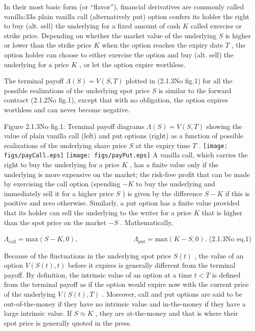 \documentclass{beamer}
\begin{document}
	\begin{frame}
		In their most basic form (or ``flavor''), financial derivatives are commonly called vanilla:33a plain vanilla call (alternatively put) option confers its holder the right to buy (alt. sell) the underlying for a fixed amount of cash $ K$ called exercise or strike price. Depending on whether the market value of the underlying $ S$ is higher or lower than the strike price $ K$ when the option reaches the expiry date $ T$ , the option holder can choose to either exercise the option and buy (alt. sell) the underlying for a price $ K$ , or let the option expire worthless.
	\end{frame}
	\begin{frame}
		The terminal payoff  $ \Lambda (S)=V(S,T)$ plotted in (2.1.3No fig.1) for all the possible realizations of the underlying spot price $ S$ is similar to the forward contract (2.1.2No fig.1), except that with no obligation, the option expires worthless and can never become negative.
		
		Figure 2.1.3No fig.1: Terminal payoff diagrams  $ \Lambda (S)=V(S,T)$ showing the value of plain vanilla call (left) and put options (right) as a function of possible realizations of the underlying share price $ S$ at the expiry time $ T$ .
		\texttt{[image: figs/payCall.eps]}        \texttt{[image: figs/payPut.eps]}
		A vanilla call, which carries the right to buy the underlying for a price $ K$ , has a finite value only if the underlying is more expensive on the market; the risk-free profit that can be made by exercising the call option (spending  $ -K$ to buy the underlying and immediately sell it for a higher price $ S$ ) is given by the difference $ S-K$ if this is positive and zero otherwise. Similarly, a put option has a finite value provided that its holder can sell the underlying to the writer for a price $ K$ that is higher than the spot price on the market $ -S$ . Mathematically,
		
		$\displaystyle \Lambda_\mathrm{call}=\mathrm{max}(S-K,0), \qquad\qquad\qquad\qquad \Lambda_\mathrm{put}=\mathrm{max}(K-S,0).$	 (2.1.3No eq.1)
		
		Because of the fluctuations in the underlying spot price $ S(t)$ , the value of an option $ V(S(t),t)$ before it expires is generally different from the terminal payoff. By definition, the intrinsic value of an option at a time $ t<T$ is defined from the terminal payoff as if the option would expire now with the current price of the underlying $ V(S(t),T)$ . Moreover, call and put options are said to be out-of-the-money if they have no intrinsic value and in-the-money if they have a large intrinsic value. If  $ S\approx K$ , they are at-the-money and that is where their spot price is generally quoted in the press. 
	\end{frame}
\end{document}

